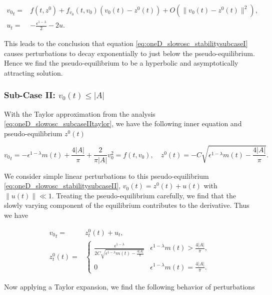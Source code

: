 \begin{equation*}
\begin{aligned}
{v_0}_t =& f(t,z^0)+f_{v_0}(t,v_0)(v_0(t)-z^0(t))+O(\lVert v_0(t)-z^0(t) \rVert^2),\\
u_t =&-\frac{\epsilon^{1-\lambda}}{2}-2u.
\end{aligned}
\end{equation*}

This leads to the conclusion that equation \eqref{eq:oneD_slowosc_stabilitysubcaseI} causes perturbations to decay exponentially to just below the pseudo-equilibrium. Hence we find the pseudo-equilibrium to be a hyperbolic and asymptotically attracting solution.

\subsubsection*{Sub-Case II: $v_0(t)\le |A|$}

With the Taylor approximation from the analysis \eqref{eq:oneD_slowosc_subcaseIItaylor}, we have the following inner equation and pseudo-equilibrium $z^0(t)$

\begin{equation}\label{eq:oneD_slowosc_stabilitysubcaseII}
{v_0}_t= -\epsilon^{1-\lambda}m(t) +\frac{4|A|}{\pi}+\frac{2}{\pi |A|}v_0^2=f(t,v_0),\quad z^0(t)=-C \sqrt{\epsilon^{1-\lambda}m(t)-\frac{4|A|}{\pi}}.
\end{equation}

We consider simple linear perturbations to this pseudo-equilibrium \eqref{eq:oneD_slowosc_stabilitysubcaseII}, $v_0(t)=z^0(t)+u(t)$ with $\lVert u(t) \rVert \ll 1$. Treating the pseudo-equilibrium carefully, we find that the slowly varying component of the equilibrium contributes to the derivative. Thus we have

\begin{equation}
\begin{aligned}
{v_0}_t =& z^0_t(t) +u_t,\\
z^0_t(t) = & \begin{cases}
\frac{\epsilon^{1-\lambda}}{2C\sqrt{\epsilon^{1-\lambda}m(t)-\frac{4|A|}{\pi}}} & \epsilon^{1-\lambda}m(t)> \frac{4|A|}{\pi},\\
0 & \epsilon^{1-\lambda}m(t) =\frac{4|A|}{\pi}.
\end{cases}
\end{aligned}
\end{equation}

Now applying a Taylor expansion, we find the following behavior of perturbations

